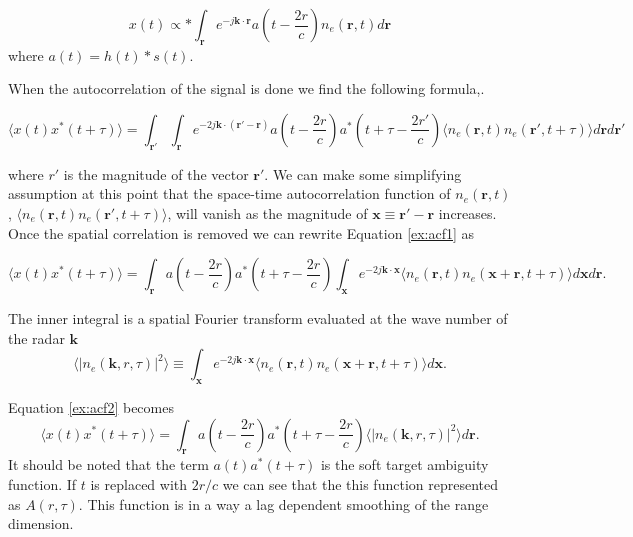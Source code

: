 \documentclass[10pt]{article}
\begin{document}
\begin{equation}
\label{ex:xtaug}
x(t) \propto \ast \int_{\mathbf{r}} e^{-j\mathbf{k} \cdot \mathbf{r}}  a(t-\frac{2r}{c}) n_e(\mathbf{r},t) d\mathbf{r}
\end{equation}
\noindent where $a(t)= h(t) \ast s(t)$.   

When the autocorrelation of the signal is done we find the following formula,\cite{nikoukar2008}.  

\begin{equation}
\label{ex:acf1}
\langle x(t)x^*(t+\tau)\rangle = \int_{\mathbf{r'}}\int_{\mathbf{r}} e^{-2j \mathbf{k}\cdot \left(\mathbf{r}'-\mathbf{r} \right)}a(t-\frac{2r}{c})a^*(t+\tau-\frac{2r'}{c}) \langle n_e(\mathbf{r},t)n_e(\mathbf{r}',t+\tau)\rangle d\mathbf{r} d\mathbf{r}'
\end{equation}
 
\noindent where $r'$ is the magnitude of the vector $\mathbf{r}'$.  We can make some simplifying assumption at this point that the space-time autocorrelation function of $n_e(\mathbf{r},t)$, $\langle n_e(\mathbf{r},t)n_e(\mathbf{r}',t+\tau)\rangle$, will vanish as the magnitude of $\mathbf{x} \equiv \mathbf{r}'-\mathbf{r} $ increases.  Once the spatial correlation is removed we can rewrite Equation \ref{ex:acf1} as 
 
 \begin{equation}
 \label{ex:acf2}
 \langle x(t)x^*(t+\tau)\rangle = \int_{\mathbf{r}} a(t-\frac{2r}{c})a^*(t+\tau -\frac{2r}{c}) \int_{\mathbf{x}} e^{-2j \mathbf{k}\cdot \mathbf{x}} \langle n_e(\mathbf{r},t)n_e(\mathbf{x}+\mathbf{r},t+\tau)\rangle d\mathbf{x} d\mathbf{r}.
 \end{equation}
 
 The inner integral is a spatial Fourier transform evaluated at the wave number of the radar $\mathbf{k}$
 \begin{equation}
 \label{eq:spft}
 \langle |n_e(\mathbf{k},r,\tau)|^2\rangle \equiv  \int_{\mathbf{x}} e^{-2j \mathbf{k}\cdot \mathbf{x} } \langle n_e(\mathbf{r},t)n_e(\mathbf{x}+\mathbf{r},t+\tau)\rangle d\mathbf{x}. 
 \end{equation}
 
 \noindent Equation \ref{ex:acf2} becomes
 \begin{equation}
 \langle x(t)x^*(t+\tau)\rangle = \int_{\mathbf{r}} a(t-\frac{2r}{c})a^*(t+\tau -\frac{2r}{c}) \langle |n_e(\mathbf{k},r,\tau)|^2\rangle d\mathbf{r}.
 \end{equation}
 It should be noted that the term $ a(t)a^*(t+\tau)$ is the soft target ambiguity function.  If $t$ is replaced with $2r/c$ we can see that the this function represented as $A(r,\tau)$\cite{nikoukar:thesis}.  This function is in a way a lag dependent smoothing of the range dimension. 
 
\end{document}
